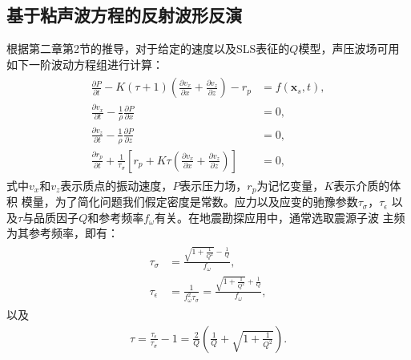 \subsection{基于粘声波方程的反射波形反演}
\vspace{1.3cm}
根据第二章第2节的推导，对于给定的速度以及SLS表征的$Q$模型，声压波场可用如下一阶波动方程组进行计算：
     \begin{eqnarray}
        \begin{aligned}
        \frac{\partial P}{\partial t} -
        K(\tau+1)(\frac{\partial v_x}{\partial x}
        +\frac{\partial v_z}{\partial z})-r_p &=f(\mathbf{x}_s,t),
        \\
        \frac{\partial v_x}{\partial t} - \frac{1}{\rho}\frac{\partial P}{\partial x}
        &=0,\\
        \frac{\partial v_z}{\partial t} - \frac{1}{\rho}\frac{\partial P}{\partial z}&=0,\\
        \frac{\partial{r_p}}{\partial t} +
        \frac{1}{\tau_\sigma}\left[r_p+K\tau(\frac{\partial
        v_x}{\partial x}+\frac{\partial v_z}{\partial z})\right]&=0,
        \end{aligned}
        \label{eq:viscoacoustic}
    \end{eqnarray}
式中$v_x$和$v_z$表示质点的振动速度，$P$表示压力场，$r_p$为记忆变量，$K$表示介质的体积
模量，为了简化问题我们假定密度是常数。应力以及应变的驰豫参数$\tau_\sigma$，$\tau_\epsilon$
以及$\tau$与品质因子$Q$和参考频率$f_\omega$有关。在地震勘探应用中，通常选取震源子波
主频为其参考频率，即有：
    \begin{eqnarray}
        \begin{aligned}
            \tau_\sigma &= \frac{\sqrt{1+\frac{1}{Q^2}}-\frac{1}{Q}}{f_\omega},\\
            \tau_\epsilon &= \frac{1}{f^2_\omega\tau_\sigma}=\frac{\sqrt{1+\frac{1}{Q^2}}+\frac{1}{Q}}{f_\omega},
        \end{aligned}
    \end{eqnarray}
以及
    \begin{eqnarray}
        \tau=\frac{\tau_\epsilon}{\tau_\sigma}-1=\frac{2}{Q}(\frac{1}{Q}+\sqrt{1+\frac{1}{Q^2}}).
        \label{eq:tq}
    \end{eqnarray}

